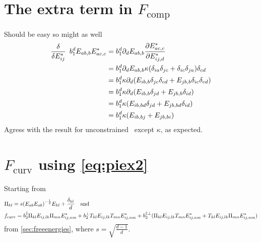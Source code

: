 \documentclass[11pt]{article}
\begin{document}
\section{The extra term in $F_\text{comp}$}
Should be easy so might as well
\begin{align}
    \fdv{E_{ij}^*}\enspace b_1^d E_{ab,b}E_{ac,c}^* &= b_1^d \pp_d E_{ab,b} \pdv{E_{ac,c}^*}{E_{ij,d}^*} \\
    &= b_1^d \pp_d E_{ab,b} \kappa(\delta_{ia}\delta_{jc}+\delta_{ic}\delta_{ja})\delta_{cd} \\
    &= b_1^d \kappa \pp_d (E_{ib,b}\delta_{jc}\delta_{cd} + E_{jb,b}\delta_{ic}\delta_{cd}) \\
    &= b_1^d \kappa \pp_d (E_{ib,b}\delta_{jd} + E_{jb,b}\delta_{id}) \\
    &= b_1^d \kappa (E_{ib,bd}\delta_{jd} + E_{jb,bd}\delta_{id}) \\
    &= b_1^d \kappa (E_{ib,bj} + E_{jb,bi}) \\
\end{align}
Agress with the result for unconstrained \EE\, except $\kappa$, as expected.

\pagebreak
\section{$F_\text{curv}$ using \cref{eq:piex2}}
Starting from
\begin{align}
    &\Pi_{kl} = s \qty(E_{ab}E_{ab})^{-\frac{1}{2}}E_{kl} + \frac{\delta_{kl}}{d} \qq{and} \\
    &f_\text{curv} = b_2^\parallel \Pi_{kl}E_{ij,lk}\Pi_{mn}E_{ij,nm}^* + b_2^\perp T_{kl}E_{ij,lk}T_{mn}E_{ij,nm}^* + b_2^{\parallel\perp}(\Pi_{kl}E_{ij,lk}T_{mn}E_{ij,nm}^* + T_{kl}E_{ij,lk}\Pi_{mn}E_{ij,nm}^*)
\end{align}
from \cref{sec:freeenergies}, where $s=\sqrt{\frac{d-1}{d}}$.
\end{document}

